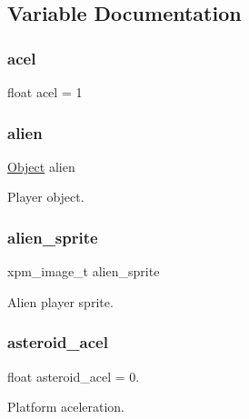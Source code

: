 \subsection{Variable Documentation}
\mbox{\label{group__Game_gab3a9c86761412cb0f30bbd761491e683}} 
\subsubsection{\texorpdfstring{acel}{acel}}
{\footnotesize\ttfamily float acel = 1}

\mbox{\label{group__Game_gab29a895e902e0b5c3ab2064a27af5a2d}} 
\subsubsection{\texorpdfstring{alien}{alien}}
{\footnotesize\ttfamily \hyperlink{structObject}{Object} alien}



Player object. 

\mbox{\label{group__Game_ga69acbc91c439d0d9f047cbe70ade84cc}} 
\subsubsection{\texorpdfstring{alien\+\_\+sprite}{alien\_sprite}}
{\footnotesize\ttfamily xpm\+\_\+image\+\_\+t alien\+\_\+sprite}



Alien player sprite. 

\mbox{\label{group__Game_ga5b34aa944fc2c29ad1b5e7ca7fb44449}} 
\subsubsection{\texorpdfstring{asteroid\+\_\+acel}{asteroid\_acel}}
{\footnotesize\ttfamily float asteroid\+\_\+acel = 0.}



Platform aceleration. 

